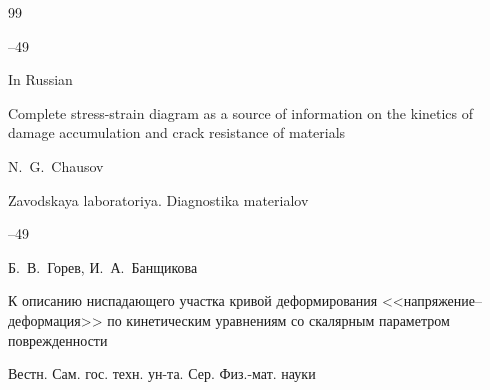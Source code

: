 \begin{thebibliography}{99}


--49

\misctransl

\lang In Russian

\paper Complete stress-strain diagram as a source of information on the kinetics of damage accumulation and crack resistance of materials

\by N.~G.~Chausov

\jour Zavodskaya laboratoriya. Diagnostika materialov



--49

























\by Б.~В.~Горев, И.~А.~Банщикова

\paper К описанию ниспадающего участка кривой деформирования <<напряжение--деформация>> по кинетическим уравнениям со скалярным параметром поврежденности

\jour Вестн. Сам. гос. техн. ун-та. Сер. Физ.-мат. науки



\end{thebibliography}
